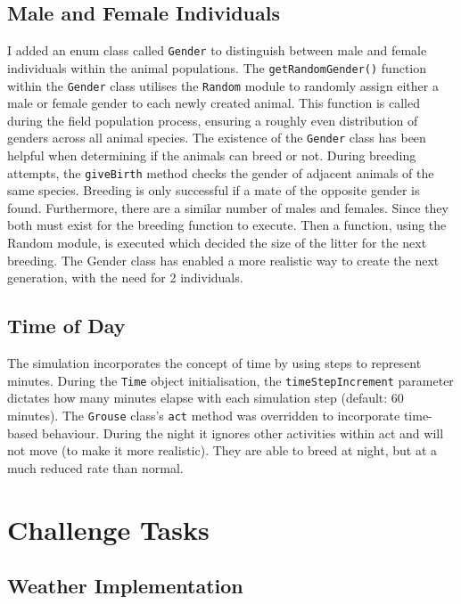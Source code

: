 \documentclass{article}
\begin{document}
\subsection{Male and Female Individuals}

I added an enum class called \texttt{Gender} to distinguish between male and female individuals within the animal populations. The \texttt{getRandomGender()} function within the \texttt{Gender} class utilises the \texttt{Random} module to randomly assign either a male or female gender to each newly created animal. This function is called during the field population process, ensuring a roughly even distribution of genders across all animal species. The existence of the \texttt{Gender} class has been helpful when determining if the animals can breed or not. During breeding attempts, the \texttt{giveBirth} method checks the gender of adjacent animals of the same species. Breeding is only successful if a mate of the opposite gender is found. Furthermore, there are a similar number of males and females. Since they both must exist for the breeding function to execute. Then a function, using the Random module, is executed which decided the size of the litter for the next breeding. The Gender class has enabled a more realistic way to create the next generation, with the need for 2 individuals.

\subsection{Time of Day}

The simulation incorporates the concept of time by using steps to represent minutes. During the \texttt{Time} object initialisation, the \texttt{timeStepIncrement} parameter dictates how many minutes elapse with each simulation step (default: 60 minutes). The \texttt{Grouse} class's \texttt{act} method was overridden to incorporate time-based behaviour. During the night it ignores other activities within act and will not move (to make it more realistic). They are able to breed at night, but at a much reduced rate than normal.

\section{Challenge Tasks}

\subsection{Weather Implementation}
\end{document}
